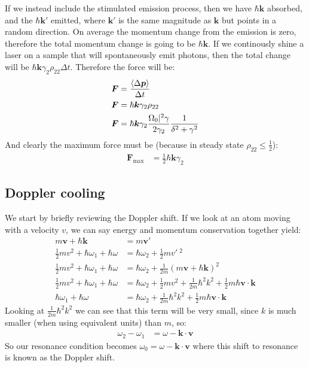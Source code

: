 If we instead include the stimulated emission process, then we have $\hbar\bm{k}$ absorbed, and the $\hbar\bm{k}'$ emitted, where $\bm{k}'$ is the same magnitude as $\bm{k}$ but points in a random direction. On average the momentum change from the emission is zero,
therefore the total momentum change is going to be $\hbar\bm{k}$. If we continously shine a laser on a sample that will spontaneously emit photons, then the total change will be $\hbar\bm{k}\gamma_2\rho_{22}\Delta t$.
Therefore the force will be:
\begin{align*}
	\bm{F} &= \frac{\expval{\Delta \bm{p}}}{\Delta t} \\
	\bm{F} &= \hbar\bm{k}\gamma_2\rho_{22} \\
	\bm{F} &= \hbar\bm{k}\gamma_2\frac{\Omega_0|^2\gamma}{2\gamma_2}\frac{1}{\delta^2 + \gamma^2}
\end{align*}
And clearly the maximum force must be (because in steady state $\rho_{22} \leq \frac{1}{2}$):
\begin{align*}
	\bm{F}_\text{max} &= \frac{1}{2}\hbar\bm{k}\gamma_2
\end{align*}
\subsection{Doppler cooling}
We start by briefly reviewing the Doppler shift. If we look at an atom moving with a velocity $v$, we can say energy and momentum conservation together yield:
\begin{align*}
	m\bm{v} + \hbar\bm{k} &= m\bm{v}' \\
	\frac{1}{2}mv^2 + \hbar\omega_1 + \hbar \omega &= \hbar\omega_2 + \frac{1}{2}mv'\ ^2 \\
	\frac{1}{2}mv^2 + \hbar\omega_1 + \hbar \omega &= \hbar\omega_2 + \frac{1}{2m} (m\bm{v} + \hbar \bm{k})^2 \\
	\frac{1}{2}mv^2 + \hbar\omega_1 + \hbar \omega &= \hbar\omega_2 + \frac{1}{2}mv^2 +\frac{1}{2m} \hbar^2k^2 + \frac{1}{2}m\hbar\bm{v}\cdot\bm{k} \\
	\hbar\omega_1 + \hbar \omega &= \hbar\omega_2 +\frac{1}{2m} \hbar^2k^2 + \frac{1}{2}m\hbar\bm{v}\cdot\bm{k}
\end{align*}
Looking at $\frac{1}{2m} \hbar^2k^2$ we can see that this term will be very small, since $k$ is much smaller (when using equivalent units) than $m$, so:
\begin{align*}
	\omega_2 - \omega_1 &= \omega - \bm{k}\cdot\bm{v}
\end{align*}
So our resonance condition becomes $\omega_0 = \omega - \bm{k}\cdot\bm{v}$ where this shift to resonance is known as the Doppler shift.

